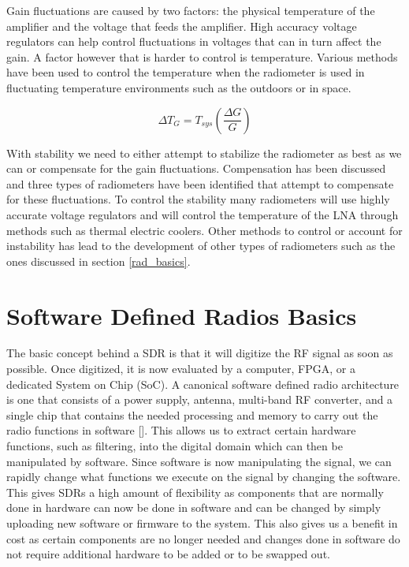 Gain fluctuations are caused by two factors: the physical temperature of the amplifier and the voltage that feeds the amplifier.  High accuracy voltage regulators can help control fluctuations in voltages that can in turn affect the gain.  A factor however that is harder to control is temperature.  Various methods have been used to control the temperature when the radiometer is used in fluctuating temperature environments such as the outdoors or in space.  

\begin{equation} \label{eq:rad_stability}
\Delta T_G=T_{sys} \left(\frac{\Delta G}{G}\right)
\end{equation}

With stability we need to either attempt to stabilize the radiometer as best as we can or compensate for the gain fluctuations.  Compensation has been discussed and three types of radiometers have been identified that attempt to compensate for these fluctuations.  To control the stability many radiometers will use highly accurate voltage regulators and will control the temperature of the LNA through methods such as thermal electric coolers.  Other methods to control or account for instability has lead to the development of other types of radiometers such as the ones discussed in section \ref{rad_basics}.

 
\section{Software Defined Radios Basics} 
The basic concept behind a SDR is that it will digitize the RF signal as soon as possible.  Once digitized, it is now evaluated by a computer, FPGA, or a dedicated System on Chip (SoC).  A canonical software defined radio architecture is one that consists of a power supply, antenna, multi-band RF converter, and a single chip that contains the needed processing and memory to carry out the radio functions in software [\cite{Mitola1995}]. This allows us to extract certain hardware functions, such as filtering, into the digital domain which can then be manipulated by software.  Since software is now manipulating the signal, we can rapidly change what functions we execute on the signal by changing the software.  This gives SDRs a high amount of flexibility as components that are normally done in hardware can now be done in software and can be changed by simply uploading new software or firmware to the system.  This also gives us a benefit in cost as certain components are no longer needed and changes done in software do not require additional hardware to be added or to be swapped out.

